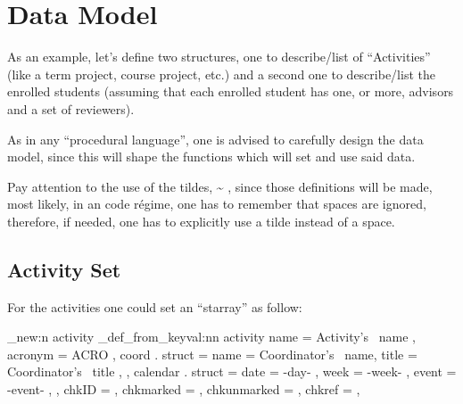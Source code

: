 \documentclass[10pt]{article}
\begin{document}

\section{Data Model}\label{DataModel}
As an example, let's define two structures, one to describe/list of ``Activities'' (like a term project, course project, etc.)  and a second one to describe/list the enrolled students (assuming that each enrolled student has one, or more, advisors and a set of reviewers).
\begin{tsremark}
As in any ``procedural language'', one is advised to  carefully design the data model, since this will shape the functions which will set and use said data.
\end{tsremark}
\begin{tsremark}
  Pay attention to the use of the tildes,  \~{} , since those definitions will be made, most likely, in an  code régime, one has to remember that spaces are ignored, therefore, if needed, one has to explicitly use a tilde instead of a space.
\end{tsremark}

\subsection{Activity Set}
For the activities one could set an ``starray'' as follow:


\begin{codestore}
\starray_new:n {activity}
\starray_def_from_keyval:nn {activity} {
    name = Activity's~ name ,
    acronym = ACRO ,
    coord . struct =  {
        name = Coordinator's~ name,
        title = Coordinator's~ title ,
      } ,
    calendar . struct = {
        date = {-day-} ,
        week = {-week-} ,
        event = {-event-} ,
      } ,
    chkID = ,        %
    chkmarked = ,    %
    chkunmarked = ,  %
    chkref = ,       %
  }
\end{codestore}
\end{document}
